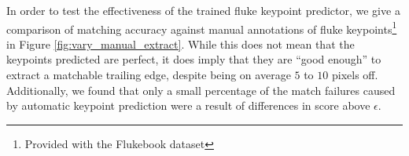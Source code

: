 In order to test the effectiveness of the trained fluke keypoint predictor, we give a comparison of matching accuracy against manual annotations of fluke keypoints\footnote{Provided with the Flukebook dataset} in Figure \ref{fig:vary_manual_extract}.
While this does not mean that the keypoints predicted are perfect, it does imply that they are ``good enough'' to extract a matchable trailing edge, despite being on average $5$ to $10$ pixels off.
Additionally, we found that only a small percentage of the match failures caused by automatic keypoint prediction were a result of differences in score above $\epsilon$.








